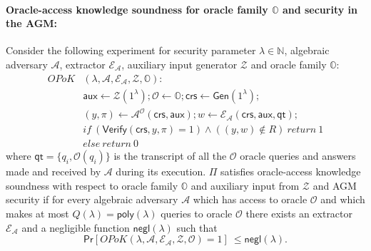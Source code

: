 \paragraph{Oracle-access knowledge soundness for oracle family $\mathbb{O}$ and security in the AGM:} Consider the following experiment for security 
parameter $\lambda \in \mathbb{N}$, algebraic adversary $\mathcal{A}$, extractor $\mathcal{E}_{\mathcal{A}}$, auxiliary 
input generator $\mathcal{Z}$ and oracle family $\mathbb{O}$:\\
\begin{align*}
\mathit{OPoK}&(\lambda, \mathcal{A}, \mathcal{E}_{\mathcal{A}}, \mathcal{Z}, \mathbb{O}): \\
& \mathsf{aux} \leftarrow \mathcal{Z}(1^{\lambda}); \mathcal{O} \leftarrow \mathbb{O}; \mathsf{crs} \leftarrow \mathsf{Gen}(1^{\lambda}); \\
& (y,\pi) \leftarrow \mathcal{A}^{\mathcal{O}}(\mathsf{crs},\mathsf{aux}); w \leftarrow \mathcal{E}_{\mathcal{A}}(\mathsf{crs}, \mathsf{aux}, \mathsf{qt}); \\
& \mathit{if} \ (\mathsf{Verify}(\mathsf{crs}, y, \pi) = 1) \wedge ((y,w) \notin R) \ \mathit{return}  \ 1 \\
& \mathit{else} \ \mathit{return} \ 0
\end{align*}
\noindent where $\mathsf{qt} = \{q_i, \mathcal{O}(q_i)\}$ is the transcript of all the $\mathcal{O}$ oracle queries and answers made and received by 
$\mathcal{A}$ during its execution. $\Pi$ satisfies oracle-access knowledge soundness with respect to oracle family  $\mathbb{O}$ and auxiliary 
input from $\mathcal{Z}$ and AGM security if for every algebraic adversary $\mathcal{A}$ which  has access to oracle ${\mathcal{O}}$  
and which makes at most $Q(\lambda) = \mathsf{poly}(\lambda)$ queries to oracle $\mathcal{O}$ there exists an extractor 
$\mathcal{E}_{\mathcal{A}}$ and a negligible function $\mathsf{negl}(\lambda)$ such that 
$$\mathsf{Pr}[\mathit{OPoK}(\lambda, \mathcal{A}, \mathcal{E}_{\mathcal{A}}, \mathcal{Z}, \mathcal{O}) =  1]\ \leq \mathsf{negl}(\lambda).$$ 


